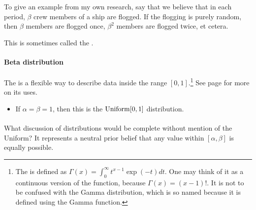 To give an example from my own research, say that we believe that in
each period, $\beta$ crew members of a ship are flogged. If the flogging
is purely random, then $\beta$ members are flogged once, $\beta^2$
members are flogged twice, et cetera.

This is sometimes called the .



\paragraph{Beta distribution} The  is a flexible
way to describe data inside the range $[0, 1]$.\footnote{The  is defined as $\Gamma(x) = \int_0^\infty  t^{x-1} \exp(-t)
dt$. One may think of it as a continuous version of the 
function, because $\Gamma(x) = (x-1)!$. It is not to be confused with
the Gamma distribution, which is so named because it is defined using
the Gamma function.}
See page \pageref{beta} for more on its uses.


\begin{itemize}
\item If $\alpha = \beta = 1$, then this is the ${\rm Uniform}[0,1]$ distribution.
\end{itemize}


\paragraph{} What discussion of distributions
would be complete without mention of the Uniform? It represents a neutral
prior belief that any value within $[\alpha, \beta]$ is equally possible.


